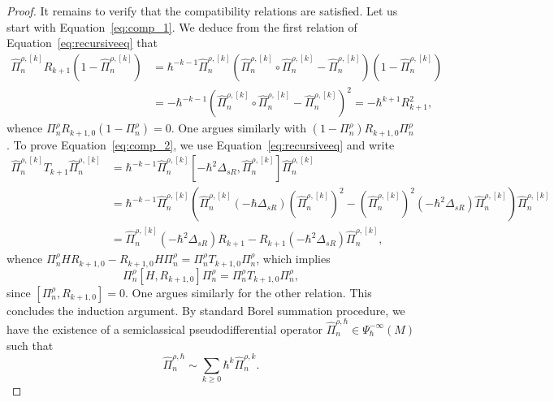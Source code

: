\documentclass[12pt,a4paper]{amsart}
\theoremstyle{plain}
\theoremstyle{definition}
\theoremstyle{remark}
\numberwithin{equation}{section}
\theoremstyle{definition}
\numberwithin{equation}{section}
\begin{document}
\begin{proof}
    It remains to verify that the compatibility relations are satisfied. Let us start with Equation~\eqref{eq:comp_1}. We deduce from the first relation of Equation~\eqref{eq:recursiveeq} that 
    \begin{equation*}
        \begin{aligned}
            \hat{\Pi}_n^{\rho,[k]} R_{k+1} (1-\hat{\Pi}_n^{\rho,[k]}) 
            &= \hbar^{-k-1} \hat{\Pi}_n^{\rho,[k]}( \hat{\Pi}_n^{\rho,[k]}\circ\hat{\Pi}_n^{\rho,[k]} - \hat{\Pi}_n^{\rho,[k]})(1-\hat{\Pi}_n^{\rho,[k]})\\
            &= -\hbar^{-k-1} (\hat{\Pi}_n^{\rho,[k]}\circ \hat{\Pi}_n^{\rho,[k]}-\hat{\Pi}_n^{\rho,[k]})^2 = -\hbar^{k+1} R_{k+1}^2,
        \end{aligned}
    \end{equation*}
    whence $\Pi_n^\rho R_{k+1,0}(1-\Pi_n^\rho) = 0$. One argues similarly with $(1-\Pi_n^\rho)R_{k+1,0}\Pi_n^\rho$.
    To prove Equation~\eqref{eq:comp_2}, we use Equation~\eqref{eq:recursiveeq} and write
    \begin{equation*}
        \begin{aligned}
            \hat{\Pi}_n^{\rho,[k]} T_{k+1} \hat{\Pi}_n^{\rho,[k]}
            &= \hbar^{-k-1}\hat{\Pi}_n^{\rho,[k]} [-\hbar^2 \Delta_{sR}, \hat{\Pi}_n^{\rho,[k]}]\hat{\Pi}_n^{\rho,[k]}\\
            &= \hbar^{-k-1} \hat{\Pi}_n^{\rho,[k]}\left(\hat{\Pi}_n^{\rho,[k]}(-\hbar \Delta_{sR})(\hat{\Pi}_n^{\rho,[k]})^2 - (\hat{\Pi}_n^{\rho,[k]})^2(-\hbar^2\Delta_{sR})\hat{\Pi}_n^{\rho,[k]}\right)\hat{\Pi}_n^{\rho,[k]}\\
            &= \hat{\Pi}_n^{\rho,[k]} (-\hbar^2\Delta_{sR})R_{k+1} - R_{k+1}(-\hbar^2\Delta_{sR})\hat{\Pi}_n^{\rho,[k]},
        \end{aligned}
    \end{equation*}
    whence $\Pi_n^\rho H R_{k+1,0} - R_{k+1,0}H\Pi_n^\rho = \Pi_n^\rho T_{k+1,0}\Pi_n^\rho$, which implies
    \begin{equation*}
        \Pi_n^\rho [H,R_{k+1,0}]\Pi_n^\rho = \Pi_n^\rho T_{k+1,0}\Pi_n^\rho,
    \end{equation*}
    since $[\Pi_n^\rho,R_{k+1,0}] = 0$. One argues similarly for the other relation. 
    This concludes the induction argument. By standard Borel summation procedure, we have the existence of a semiclassical pseudodifferential operator $\hat{\Pi}_n^{\rho,\hbar} \in \Psi_\hbar^{-\infty}(M)$ such that
    \begin{equation*}
        \hat{\Pi}_n^{\rho,\hbar} \sim \sum_{k\geq 0} \hbar^k \hat{\Pi}_n^{\rho,k}.

\end{equation*}
\end{proof}
\end{document}
